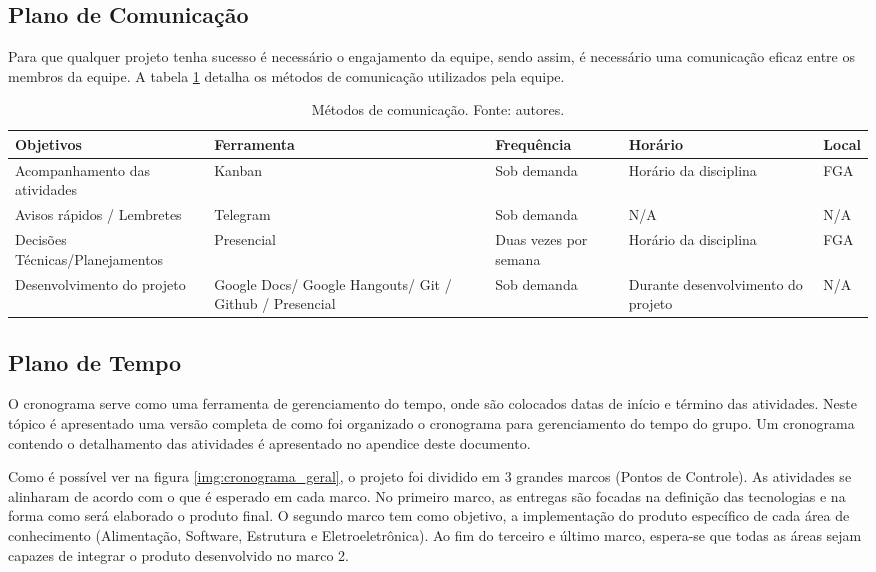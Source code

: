     \subsection{Plano de Comunicação}

      Para que qualquer projeto tenha sucesso é necessário o engajamento da equipe, sendo assim, é necessário uma comunicação eficaz entre os membros da equipe. A tabela \ref{tab:com} detalha os métodos de comunicação utilizados pela equipe.
      
      \begin{table}[!htbp]
      	\begin{center}
      		\caption{\label{tab:com}Métodos de comunicação. Fonte: autores.}
      		\begin{tabular}{|p{4cm}|p{4cm}|p{3cm}|p{3cm}|p{2cm}|}
      			\hline
      			\textbf{Objetivos} & \textbf{Ferramenta} & \textbf{Frequência} & \textbf{Horário} & \textbf{Local}\\\hline\hline
      			Acompanhamento das atividades & Kanban & Sob demanda & Horário da disciplina & FGA\\\hline
      			Avisos rápidos / Lembretes & Telegram & Sob demanda & N/A & N/A\\\hline
      			Decisões Técnicas/Planejamentos & Presencial & Duas vezes por semana & Horário da disciplina & FGA\\\hline
      			Desenvolvimento do projeto & Google Docs/ Google Hangouts/ Git / Github / Presencial & Sob demanda & Durante desenvolvimento do projeto & N/A\\\hline
      		\end{tabular}
      	\end{center}
      \end{table}

\newpage

    \subsection{Plano de Tempo}
	O cronograma serve como uma ferramenta de gerenciamento do tempo, onde são colocados datas de início e término das atividades. Neste tópico é apresentado uma versão completa de como foi organizado o cronograma para gerenciamento do tempo do grupo. Um cronograma contendo o detalhamento das atividades é apresentado no apendice deste documento.

	Como é possível ver na figura \ref{img:cronograma_geral}, o projeto foi dividido em 3 grandes marcos (Pontos de Controle). As atividades se alinharam de acordo com o que é esperado em cada marco. No primeiro marco, as entregas são focadas na definição das tecnologias e na forma como será elaborado o produto final. O segundo marco tem como objetivo, a implementação do produto específico de cada área de conhecimento (Alimentação, Software, Estrutura e Eletroeletrônica). Ao fim do terceiro e último marco, espera-se que todas as áreas sejam capazes de integrar o produto desenvolvido no marco 2. 

